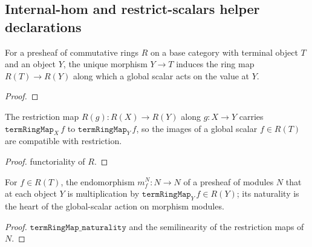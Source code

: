 \subsection{Internal-hom and restrict-scalars helper declarations}
\label{mk-subsec:tensorobj_internalhom_helpers}


\begin{definition}\label{mk-def:term_ring_map}
  \leanok

  For a presheaf of commutative rings \(R\) on a base category with terminal object
  \(T\) and an object \(Y\), the unique morphism \(Y \to T\) induces the ring map
  \(R(T) \to R(Y)\) along which a global scalar acts on the value at \(Y\).
\end{definition}
\begin{proof}
  \leanok

\end{proof}

\begin{lemma}\label{mk-lem:term_ring_map_naturality}
  \leanok

  The restriction map \(R(g) : R(X) \to R(Y)\) along \(g : X \to Y\) carries
  \(\mathtt{termRingMap}_X\,f\) to \(\mathtt{termRingMap}_Y\,f\), so the images of a
  global scalar \(f \in R(T)\) are compatible with restriction.
\end{lemma}
\begin{proof}
  \leanok
  functoriality of \(R\).
\end{proof}

\begin{definition}\label{mk-def:global_smul}
  \leanok

  For \(f \in R(T)\), the endomorphism \(m_f^{N} : N \to N\) of a presheaf of modules
  \(N\) that at each object \(Y\) is multiplication by \(\mathtt{termRingMap}_Y\,f \in
  R(Y)\); its naturality is the heart of the global-scalar action on morphism modules.
\end{definition}
\begin{proof}
  \leanok
  \(\mathtt{termRingMap\_naturality}\) and the semilinearity of the restriction maps of
  \(N\).
\end{proof}

